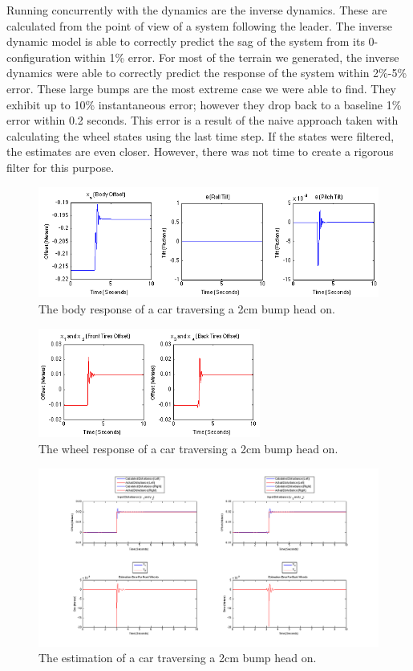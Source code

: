 Running concurrently with the dynamics are the inverse dynamics. These are calculated from the point of view of a system following the leader. The inverse dynamic model is able to correctly predict the sag of the system from its 0-configuration within 1\% error. For most of the terrain we generated, the inverse dynamics were able to correctly predict the response of the system within 2\%-5\% error. These large bumps are the most extreme case we were able to find. They exhibit up to 10\% instantaneous error; however they drop back to a baseline 1\% error within 0.2 seconds. This error is a result of the naive approach taken with calculating the wheel states using the last time step. If the states were filtered, the estimates are even closer. However, there was not time to create a rigorous filter for this purpose.

\begin{figure}[t]
	\centering
	\includegraphics[width=1.0\textwidth]{figures/results_2cm_body.png}
	\caption{The body response of a car traversing a 2cm bump head on.}
	\label{fig:fullcar_2cm_body}
\end{figure}

\begin{figure}[t]
	\centering
	\includegraphics[width=0.65\textwidth]{figures/results_2cm_wheel.png}
	\caption{The wheel response of a car traversing a 2cm bump head on.}
	\label{fig:fullcar_2cm_wheel}
\end{figure}

\begin{figure}[t]
	\centering
	\includegraphics[width=1.0\textwidth]{figures/fullcar_2cm_straight_inverse.png}
	\caption{The estimation of a car traversing a 2cm bump head on.}
	\label{fig:fullcar_2cm}
\end{figure}

